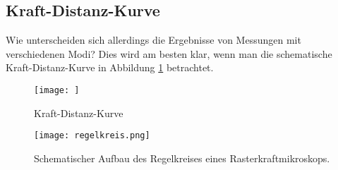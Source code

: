 




\subsection{Kraft-Distanz-Kurve}
Wie unterscheiden sich allerdings die Ergebnisse von Messungen mit verschiedenen Modi? Dies wird am besten klar, wenn man die schematische Kraft-Distanz-Kurve in Abbildung \ref{fig:Fz} betrachtet. 

\begin{figure}[h]
	\centering
	\texttt{[image: ]}
	\caption{Kraft-Distanz-Kurve}
	\label{fig:Fz}
\end{figure}







\begin{figure}[h]
	\centering
	\texttt{[image: regelkreis.png]}
	\caption{Schematischer Aufbau des Regelkreises eines Rasterkraftmikroskops.}
	\label{fig:feedback}
\end{figure}

\subsection{}